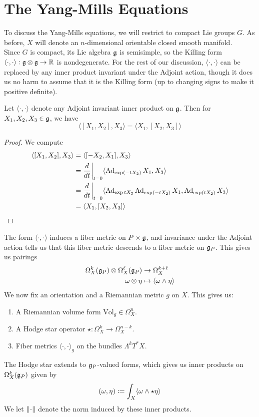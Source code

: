 %
\section{The Yang-Mills Equations}
%
To discuss the Yang-Mills equations, we will restrict to compact Lie groups
$G$. As before, $X$ will denote an $n$-dimensional orientable closed smooth manifold. \\

Since $G$ is compact, its Lie algebra $\mathfrak{g}$ is semisimple, so the Killing
form $\langle\cdot,\cdot\rangle : \mathfrak{g} \otimes \mathfrak{g} \to \mathbb{R}$ is nondegenerate.
For the rest of our discussion, $\langle\cdot,\cdot\rangle$ can be replaced by
any inner product invariant under the Adjoint action, though it does us no
harm to assume that it is the Killing form (up to changing signs to make it
positive definite).
%
\begin{lem}
Let $\langle\cdot,\cdot\rangle$ denote any Adjoint invariant inner product on $\mathfrak{g}$.
Then for $X_1,X_2,X_3 \in \mathfrak{g}$, we have
\[
\langle[X_1,X_2],X_3\rangle = \langle X_1,[X_2,X_3]\rangle
\]
\end{lem}
%
\begin{proof}
We compute
\begin{align*}
\langle[X_1,X_2],X_3\rangle &= \langle[-X_2,X_1],X_3\rangle \\
&= \frac{d}{dt}\bigg\vert_{t=0}\langle\operatorname{Ad}_{\exp(-tX_2)}X_1,X_3\rangle \\
&= \frac{d}{dt}\bigg\vert_{t=0}
\langle\operatorname{Ad}_{\exp{tX_2}}\operatorname{Ad}_{\exp(-tX_2)}X_1,\operatorname{Ad}_{\exp(tX_2)}X_3\rangle \\
&= \langle X_1,[X_2,X_3]\rangle
\end{align*}
\end{proof}
%
The form $\langle\cdot,\cdot\rangle$ induces a fiber metric on
$P \times \mathfrak{g}$, and invariance under the Adjoint action tells us that
this fiber metric descends to a fiber metric on $\mathfrak{g}_P$. This gives
us pairings
\begin{align*}
\Omega^k_X(\mathfrak{g}_P) \otimes \Omega^\ell_X(\mathfrak{g}_P) &\to \Omega^{k+\ell}_X \\
\omega \otimes \eta &\mapsto \langle\omega\wedge\eta\rangle
\end{align*}
We now fix an orientation and a Riemannian metric $g$ on $X$. This gives us:
\begin{enumerate}
  \item A Riemannian volume form $\mathrm{Vol}_g \in \Omega^n_X$.
  \item A Hodge star operator $\star : \Omega^k_X \to \Omega^{n-k}_X$.
  \item Fiber metrics $\langle\cdot,\cdot\rangle_g$ on the bundles
  $\Lambda^kT^*X$.
\end{enumerate}
%
The Hodge star extends to $\mathfrak{g}_P$-valued forms, which gives us inner products
on $\Omega^k_X(\mathfrak{g}_P)$ given by
\[
(\omega,\eta) \vcentcolon= \int_X \langle\omega\wedge\star\eta\rangle
\]
We let $\left\lVert\cdot\right\rVert$ denote the norm induced by these inner products. \\

